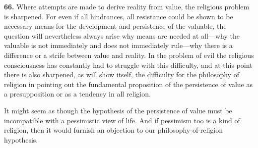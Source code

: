 \documentclass[12pt,a4paper]{book}
\begin{document}
\medskip

\noindent\textbf{66.} Where attempts are made to derive reality from value, the religious problem is
sharpened. For even if all hindrances, all resistance could be shown to be necessary means for the
development and persistence of the valuable, the question will nevertheless always arise why means are
needed at all---why the valuable is not immediately and does not immediately rule---why there is a
difference or a strife between value and reality. In the problem of evil the religious consciousness has
constantly had to struggle with this difficulty, and at this point there is also sharpened, as will show
itself, the difficulty for the philosophy of religion in pointing out the fundamental proposition of the
persistence of value as a presupposition or as a tendency in all religion.

It might seem as though the hypothesis of the persistence of value must be incompatible with a pessimistic
view of life. And if pessimism too is a kind of religion, then it would furnish an objection to our
philosophy-of-religion hypothesis.
\end{document}
